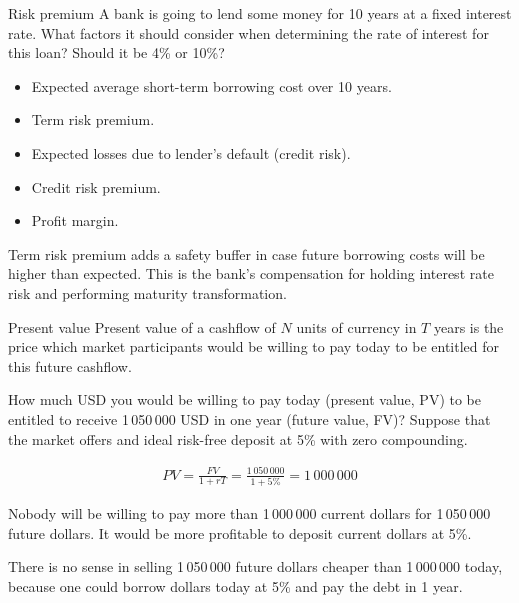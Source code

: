 \documentclass{beamer}
\begin{document}
\begin{frame}{Risk premium}
\justify
A bank is going to lend some money for 10 years at a fixed interest rate. What factors it should consider when determining the rate of interest for this loan? Should it be 4\% or 10\%?

\begin{itemize}
\justifying
\item Expected average short-term borrowing cost over 10 years.
\item Term risk premium.
\item Expected losses due to lender's default (credit risk).
\item Credit risk premium.
\item Profit margin.
\end{itemize}

\justify
Term risk premium adds a safety buffer in case future borrowing costs will be higher than expected. This is the bank's compensation for holding interest rate risk and performing maturity transformation.

\end{frame}



\begin{frame}{Present value}
\justify
\alert{Present value} of a cashflow of $N$ units of currency in $T$ years is the price which market participants would be willing to pay today to be entitled for this future cashflow.

\justify
How much USD you would be willing to pay today (present value, PV) to be entitled to receive 1\,050\,000 USD in one year (future value, FV)? Suppose that the market offers and ideal risk-free deposit at 5\% with zero compounding.

\begin{align*}
PV = \frac{FV}{1+rT} = \frac{1\,050\,000}{1 + 5\%} = 1\,000\,000
\end{align*}

\justify
Nobody will be willing to pay more than 1\,000\,000 current dollars for 1\,050\,000 future dollars. It would be more profitable to deposit current dollars at 5\%.

\justify
There is no sense in selling 1\,050\,000 future dollars cheaper than 1\,000\,000 today, because one could borrow dollars today at 5\% and pay the debt in 1 year.
\end{frame}
\end{document}

